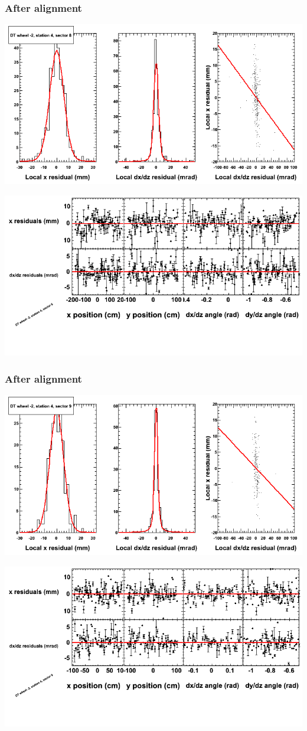 \documentclass[compress]{beamer}
\begin{document}
\begin{frame}
\frametitle{After alignment}
\includegraphics[width=0.7\linewidth]{NOV4_fitfunctions/MBwhAst4sec08_bellcurves.png}

\includegraphics[width=0.7\linewidth]{NOV4_fitfunctions/MBwhAst4sec08_polynomials.png}
\end{frame}

\begin{frame}
\frametitle{After alignment}
\includegraphics[width=0.7\linewidth]{NOV4_fitfunctions/MBwhAst4sec09_bellcurves.png}

\includegraphics[width=0.7\linewidth]{NOV4_fitfunctions/MBwhAst4sec09_polynomials.png}
\end{frame}
\end{document}
